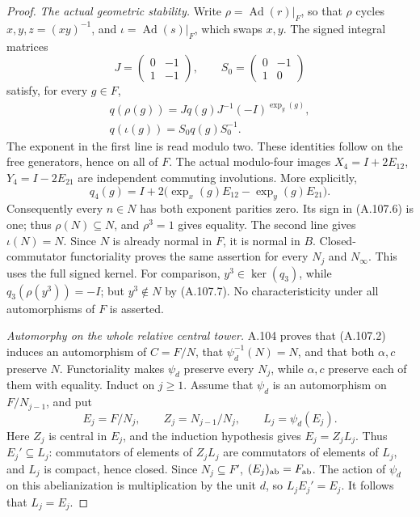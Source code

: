 \begin{proof}
\emph{The actual geometric stability.}
Write \(\rho=\operatorname{Ad}(r)|_F\), so that \(\rho\) cycles
\(x,y,z=(xy)^{-1}\), and \(\iota=\operatorname{Ad}(s)|_F\), which swaps
\(x,y\). The signed integral matrices
\[
 J=\begin{pmatrix}0&-1\\1&-1\end{pmatrix},\qquad
 S_0=\begin{pmatrix}0&-1\\1&0\end{pmatrix}
\]
satisfy, for every \(g\in F\),
\[
 \begin{gathered}
 q(\rho(g))=Jq(g)J^{-1}(-I)^{\operatorname{exp}_y(g)},\\
 q(\iota(g))=S_0q(g)S_0^{-1}.
 \end{gathered}
 \tag{A.107.6}
\]
The exponent in the first line is read modulo two. These identities
follow on the free generators, hence on all of \(F\).
The actual modulo-four images
\(X_4=I+2E_{12}\), \(Y_4=I-2E_{21}\) are independent commuting
involutions. More explicitly,
\[
 q_4(g)=I+2\bigl(\operatorname{exp}_x(g)E_{12}
                       -\operatorname{exp}_y(g)E_{21}\bigr).
 \tag{A.107.7}
\]
Consequently every \(n\in N\) has both exponent parities zero.
Its sign in (A.107.6) is one; thus \(\rho(N)\subseteq N\), and
\(\rho^3=1\) gives equality. The second line gives
\(\iota(N)=N\). Since \(N\) is already normal in \(F\), it is normal
in \(B\). Closed-commutator functoriality proves the same assertion
for every \(N_j\) and \(N_\infty\).
This uses the full signed kernel. For comparison,
\(y^3\in\ker(q_3)\), while \(q_3(\rho(y^3))=-I\);
but \(y^3\notin N\) by (A.107.7). No characteristicity under all
automorphisms of \(F\) is asserted.

\emph{Automorphy on the whole relative central tower.}
A.104 proves that (A.107.2) induces an automorphism of \(C=F/N\),
that \(\psi_d^{-1}(N)=N\), and that both \(\alpha,c\) preserve \(N\).
Functoriality makes \(\psi_d\) preserve every \(N_j\), while
\(\alpha,c\) preserve each of them with equality.
Induct on \(j\geq1\). Assume that \(\psi_d\) is an automorphism on
\(F/N_{j-1}\), and put
\[
 E_j=F/N_j,\qquad Z_j=N_{j-1}/N_j,\qquad
 L_j=\psi_d(E_j).
\]
Here \(Z_j\) is central in \(E_j\), and the induction hypothesis gives
\(E_j=Z_jL_j\). Thus \(E_j'\subseteq L_j\): commutators of elements
of \(Z_jL_j\) are commutators of elements of \(L_j\), and \(L_j\)
is compact, hence closed. Since \(N_j\subseteq F'\),
\((E_j)_{\rm ab}=F_{\rm ab}\). The action of \(\psi_d\) on this
abelianization is multiplication by the unit \(d\), so
\(L_jE_j'=E_j\). It follows that \(L_j=E_j\).


\end{proof}
